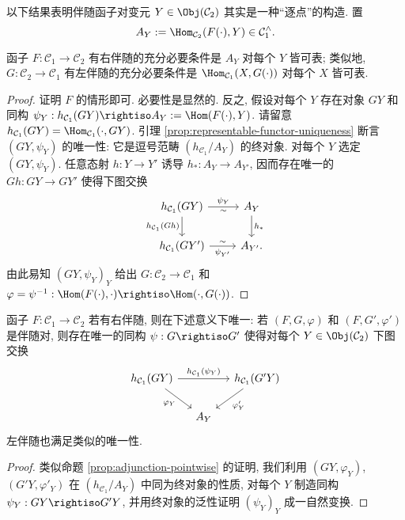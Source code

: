 以下结果表明伴随函子对变元 $Y \in \Obj(\mathcal{C}_2)$ 其实是一种``逐点''的构造. 置
\[ A_Y := \Hom_{\mathcal{C}_2}(F(\cdot), Y) \in \mathcal{C}_1^\wedge. \]

\begin{proposition}\label{prop:adjunction-pointwise}
	函子 $F: \mathcal{C}_1 \to \mathcal{C}_2$ 有右伴随的充分必要条件是 $A_Y$ 对每个 $Y$ 皆可表; 类似地, $G: \mathcal{C}_2 \to \mathcal{C}_1$ 有左伴随的充分必要条件是 $\Hom_{\mathcal{C}_1}(X, G(\cdot))$ 对每个 $X$ 皆可表.
\end{proposition}
\begin{proof}
	证明 $F$ 的情形即可. 必要性是显然的. 反之, 假设对每个 $Y$ 存在对象 $GY$ 和同构 $\psi_Y: h_{\mathcal{C}_1}(GY) \rightiso A_Y := \Hom(F(\cdot), Y)$. 请留意 $h_{\mathcal{C}_1}(GY) = \Hom_{\mathcal{C}_1}(\cdot, GY)$. 引理 \ref{prop:representable-functor-uniqueness} 断言 $(GY, \psi_Y)$ 的唯一性: 它是逗号范畴 $(h_{\mathcal{C}_1} / A_Y)$ 的终对象. 对每个 $Y$ 选定 $(GY, \psi_Y)$. 任意态射 $h: Y \to Y'$ 诱导 $h_*: A_Y \to A_{Y'}$, 因而存在唯一的 $Gh: GY \to GY'$ 使得下图交换
	\[ \begin{tikzcd}
		h_{\mathcal{C}_1}(GY) \arrow[d, "{h_{\mathcal{C}_1}(Gh)}"'] \arrow[r, "\psi_Y", "\sim"'] & A_Y \arrow[d, "h_*"] \\
		h_{\mathcal{C}_1}(GY') \arrow[r, "{\psi_{Y'}}"', "\sim"] & A_{Y'} .
	\end{tikzcd} \]
	由此易知 $(GY, \psi_Y)_Y$ 给出 $G: \mathcal{C}_2 \to \mathcal{C}_1$ 和 $\varphi = \psi^{-1}: \Hom(F(\cdot), \cdot) \rightiso \Hom(\cdot, G(\cdot))$.
\end{proof}

\begin{proposition}\label{prop:adjunction-uniqueness}
	函子 $F: \mathcal{C}_1 \to \mathcal{C}_2$ 若有右伴随, 则在下述意义下唯一: 若 $(F, G, \varphi)$ 和 $(F, G', \varphi')$ 是伴随对, 则存在唯一的同构 $\psi: G \rightiso G'$ 使得对每个 $Y \in \Obj(\mathcal{C}_2)$ 下图交换
	\[ \begin{tikzcd}[column sep=small]
		h_{\mathcal{C}_1}(GY) \arrow[rr, "{h_{\mathcal{C}_1}(\psi_Y)}"] \arrow[rd, "\varphi_Y"'] & & h_{\mathcal{C}_1}(G'Y) \arrow[ld, "{{\varphi}'_Y}"] \\
		& A_Y &
	\end{tikzcd} \]
	左伴随也满足类似的唯一性.
\end{proposition}
\begin{proof}
	类似命题 \ref{prop:adjunction-pointwise} 的证明, 我们利用 $(GY, \varphi_Y)$, $(G'Y, {\varphi}'_Y)$ 在 $(h_{\mathcal{C}_1} / A_Y)$ 中同为终对象的性质, 对每个 $Y$ 制造同构 $\psi_Y: GY \rightiso G'Y$, 并用终对象的泛性证明 $(\psi_Y)_Y$ 成一自然变换.
\end{proof}

